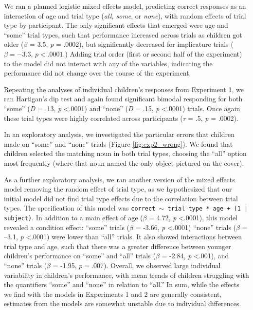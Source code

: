 \documentclass[man]{apa2}
\begin{document}
We ran a planned logistic mixed effects model, predicting correct responses as an interaction of age and trial type (\textit{all, some}, or \textit{none}), with random effects of trial type by participant. The only significant effects that emerged were age and ``some'' trial types, such that performance increased across trials as children got older ($\beta$ = 3.5, \textit{p} =  .0002), but significantly decreased for implicature trials ($\beta = -3.3$, $p < .0001$.) Adding trial order (first or second half of the experiment) to the model did not interact with any of the variables, indicating the performance did not change over the course of the experiment.

Repeating the analyses of individual children's responses from Experiment 1, we ran Hartigan's dip test and again found significant bimodal responding for both ``some'' (\textit{D} = .13, \textit{p} \textless  .0001) and ``none'' (\textit{D} = .15, \textit{p} \textless  .0001) trials. Once again these trial types were highly correlated across participants (\textit{r} = .5, \textit{p} = .0002).

In an exploratory analysis, we investigated the particular errors that children made on ``some'' and ``none'' trials (Figure \ref{fig:exp2_wrong}). We found that children selected the matching noun in both trial types, choosing the ``all'' option most frequently (where that noun named the only object pictured on the cover).

As a further exploratory analysis, we ran another version of the mixed effects model removing the random effect of trial type, as we hypothesized that our initial model did not find trial type effects due to the correlation between trial types. The specification of this model was \texttt{correct $\sim$ trial type * age + (1 | subject)}. In addition to a main effect of age ($\beta$ = 4.72, \textit{p} \textless .0001), this model revealed a condition effect: ``some'' trials ($\beta$ = -3.66, \emph{p} \textless .0001) ``none'' trials ($\beta$ = --3.1, \emph{p} \textless .0001) were lower than ``all'' trials. It also showed interactions between trial type and age, such that there was a greater difference between younger children's performance on ``some'' and ``all'' trials ($\beta$ = -2.84, \textit{p} \textless  .001), and ``none'' trials ($\beta$ = -1.95, $p = .007$). Overall, we observed large individual variability in children's performance, with mean trends of children struggling with the quantifiers ``some'' and ``none'' in relation to ``all.'' In sum, while the effects we find with the models in Experiments 1 and 2 are generally consistent, estimates from the models are somewhat unstable due to individual differences.
\end{document}
